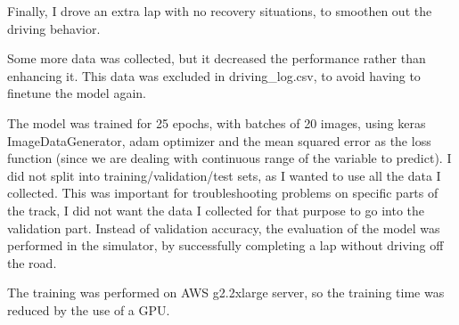 \documentclass[a4paper,10pt]{article}
\begin{document}
Finally, I drove an extra lap with no recovery situations, to smoothen out the driving behavior.

Some more data was collected, but it decreased the performance rather than enhancing it.
This data was excluded in driving\_log.csv, to avoid having to finetune the model again.

The model was trained for 25 epochs, with batches of 20 images, using keras ImageDataGenerator, adam optimizer and the mean squared error as the loss function
(since we are dealing with continuous range of the variable to predict).
I did not split into training/validation/test sets, as I wanted to use all the data I collected.
This was important for troubleshooting problems on specific parts of the track, I did not want the data I collected for that purpose to go into the validation part.
Instead of validation accuracy, the evaluation of the model was performed in the simulator, by successfully completing a lap without driving off the road.

The training was performed on AWS g2.2xlarge server, so the training time was reduced by the use of a GPU.
\end{document}

